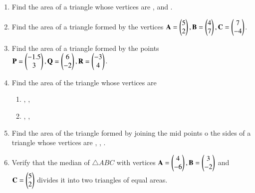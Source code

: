 \renewcommand{\theequation}{\theenumi}
\begin{enumerate}[label=\arabic*.,ref=\thesubsection.\theenumi]

\item Find the area of a triangle whose vertices are ,  and .
\item Find the area of a triangle formed by the vertices $\mathbf{A}=\begin{pmatrix}5\\2\end{pmatrix}, \mathbf{B}=\begin{pmatrix}4\\7\end{pmatrix}, \mathbf{C}=\begin{pmatrix}7\\-4\end{pmatrix}$.
\item Find the area of a triangle formed by the points $\mathbf{P}=\begin{pmatrix}-1.5\\3\end{pmatrix}, \mathbf{Q}=\begin{pmatrix}6\\-2\end{pmatrix}, \mathbf{R}=\begin{pmatrix}-3\\4\end{pmatrix}$.
\item Find the area of the triangle whose vertices are
\begin{enumerate}
\item {}, ,  
\item  {},  ,  
\end{enumerate}
\item Find the area of the triangle formed by joining the mid points o the sides of a triangle whose vertices are  ,  ,  .
\item Verify that the median of $\triangle ABC$ with vertices $\mathbf{A}=\begin{pmatrix}4\\-6\end{pmatrix},  \mathbf{B}=\begin{pmatrix}3\\-2\end{pmatrix}$ and  $\mathbf{C} =  \begin{pmatrix}5\\2\end{pmatrix}$ divides it into two triangles of equal areas.

\end{enumerate}
%
